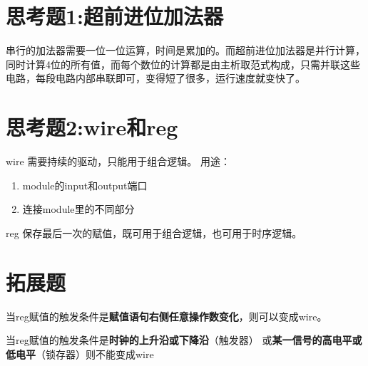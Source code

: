 \documentclass[a4paper]{article}
\begin{document}
\section{思考题1:超前进位加法器}
	串行的加法器需要一位一位运算，时间是累加的。而超前进位加法器是并行计算，同时计算4位的所有值，而每个数位的计算都是由主析取范式构成，只需并联这些电路，每段电路内部串联即可，变得短了很多，运行速度就变快了。
\section{思考题2:wire和reg}
	wire 需要持续的驱动，只能用于组合逻辑。
	用途：
	\begin{enumerate}
		\item module的input和output端口
		\item 连接module里的不同部分
	\end{enumerate}

	reg 保存最后一次的赋值，既可用于组合逻辑，也可用于时序逻辑。
\section{拓展题}
	当reg赋值的触发条件是\textbf{赋值语句右侧任意操作数变化}，则可以变成wire。

	当reg赋值的触发条件是\textbf{时钟的上升沿或下降沿}（触发器） 或\textbf{某一信号的高电平或低电平}（锁存器）则不能变成wire
\end{document}
